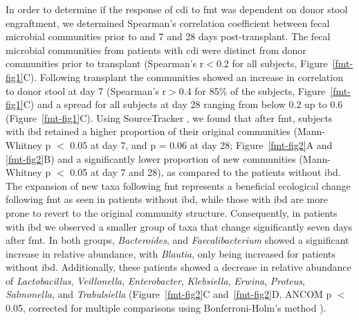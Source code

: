 In order to determine if the response of \gls{cdi} to \gls{fmt} was dependent on donor stool engraftment, we determined Spearman's correlation coefficient between fecal microbial communities prior to and 7 and 28 days post-transplant. The fecal microbial communities from patients with \gls{cdi} were distinct from donor communities prior to transplant (Spearman's r$<$0.2 for all subjects, Figure~\ref{fmt-fig1}C). Following transplant the communities showed an increase in correlation to donor stool at day 7 (Spearman's r$>$0.4 for 85\% of the subjects, Figure~\ref{fmt-fig1}C) and a spread for all subjects at day 28 ranging from below 0.2 up to 0.6 (Figure~\ref{fmt-fig1}C). Using SourceTracker \cite{RN3995}, we found that after \gls{fmt}, subjects with \gls{ibd} retained a higher proportion of their original communities (Mann-Whitney p $<$ 0.05 at day 7, and p = 0.06 at day 28; Figure~\ref{fmt-fig2}A and \ref{fmt-fig2}B) and a significantly lower proportion of new communities (Mann-Whitney p $<$ 0.05 at day 7 and 28), as compared to the patients without \gls{ibd}. The expansion of new taxa following \gls{fmt} represents a beneficial ecological change following \gls{fmt} as seen in patients without \gls{ibd}, while those with \gls{ibd} are more prone to revert to the original community structure. Consequently, in patients with \gls{ibd} we observed a smaller group of taxa that change significantly seven days after \gls{fmt}. In both groups, \textit{Bacteroides}, and \textit{Faecalibacterium} showed a significant increase in relative abundance, with \textit{Blautia}, only being increased for patients without \gls{ibd}. Additionally, these patients showed a decrease in relative abundance of \textit{Lactobacillus}, \textit{Veillonella}, \textit{Enterobacter}, \textit{Klebsiella}, \textit{Erwina}, \textit{Proteus}, \textit{Salmonella}, and \textit{Trabulsiella} (Figure~\ref{fmt-fig2}C and~\ref{fmt-fig2}D, ANCOM p $<$ 0.05, corrected for multiple comparisons using Bonferroni-Holm's method \cite{RN1513}).

